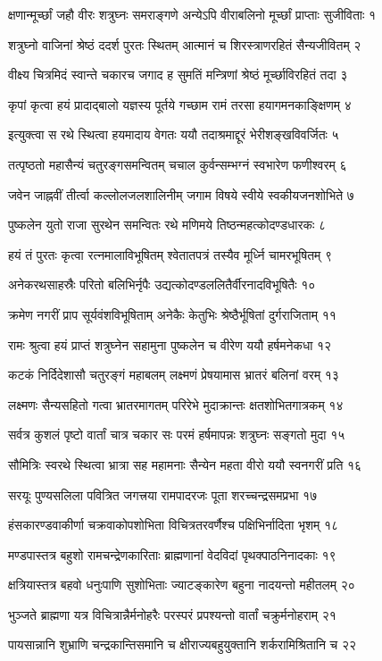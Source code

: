 क्षणान्मूर्च्छां जहौ वीरः शत्रुघ्नः समराङ्गणे
अन्येऽपि वीराबलिनो मूर्च्छां प्राप्ताः सुजीविताः १

शत्रुघ्नो वाजिनां श्रेष्ठं ददर्श पुरतः स्थितम्
आत्मानं च शिरस्त्राणरहितं सैन्यजीवितम् २

वीक्ष्य चित्रमिदं स्वान्ते चकारच जगाद ह
सुमतिं मन्त्रिणां श्रेष्ठं मूर्च्छाविरहितं तदा ३

कृपां कृत्वा हयं प्रादाद्बालो यज्ञस्य पूर्तये
गच्छाम रामं तरसा हयागमनकाङ्क्षिणम् ४

इत्युक्त्वा स रथे स्थित्वा हयमादाय वेगतः
ययौ तदाश्रमाद्दूरं भेरीशङ्खविवर्जितः ५

तत्पृष्ठतो महासैन्यं चतुरङ्गसमन्वितम्
चचाल कुर्वन्सम्भग्नं स्वभारेण फणीश्वरम् ६

जवेन जाह्नवीं तीर्त्वा कल्लोलजलशालिनीम्
जगाम विषये स्वीये स्वकीयजनशोभिते ७

पुष्कलेन युतो राजा सुरथेन समन्वितः
रथे मणिमये तिष्ठन्महत्कोदण्डधारकः ८

हयं तं पुरतः कृत्वा रत्नमालाविभूषितम्
श्वेतातपत्रं तस्यैव मूर्ध्नि चामरभूषितम् ९

अनेकरथसाहस्रैः परितो बलिभिर्नृपैः
उद्यत्कोदण्डललितैर्वीरनादविभूषितैः १०

क्रमेण नगरीं प्राप सूर्यवंशविभूषिताम्
अनेकैः केतुभिः श्रेष्ठैर्भूषितां दुर्गराजिताम् ११

रामः श्रुत्वा हयं प्राप्तं शत्रुघ्नेन सहामुना
पुष्कलेन च वीरेण ययौ हर्षमनेकधा १२

कटकं निर्दिदेशासौ चतुरङ्गं महाबलम्
लक्ष्मणं प्रेषयामास भ्रातरं बलिनां वरम् १३

लक्ष्मणः सैन्यसहितो गत्वा भ्रातरमागतम्
परिरेभे मुदाक्रान्तः क्षतशोभितगात्रकम् १४

सर्वत्र कुशलं पृष्टो वार्तां चात्र चकार सः
परमं हर्षमापन्नः शत्रुघ्नः सङ्गतो मुदा १५

सौमित्रिः स्वरथे स्थित्वा भ्रात्रा सह महामनाः
सैन्येन महता वीरो ययौ स्वनगरीं प्रति १६

सरयूः पुण्यसलिला पवित्रित जगत्त्रया
रामपादरजः पूता शरच्चन्द्रसमप्रभा १७

हंसकारण्डवाकीर्णा चक्रवाकोपशोभिता
विचित्रतरवर्णैश्च पक्षिभिर्नादिता भृशम् १८

मण्डपास्तत्र बहुशो रामचन्द्रेणकारिताः
ब्राह्मणानां वेदविदां पृथक्पाठनिनादकाः १९

क्षत्रियास्तत्र बहवो धनुःपाणि सुशोभिताः
ज्याटङ्कारेण बहुना नादयन्तो महीतलम् २०

भुञ्जते ब्राह्मणा यत्र विचित्रान्नैर्मनोहरैः
परस्परं प्रपश्यन्तो वार्तां चक्रुर्मनोहराम् २१

पायसान्नानि शुभ्राणि चन्द्रकान्तिसमानि च
क्षीराज्यबहुयुक्तानि शर्करामिश्रितानि च २२

